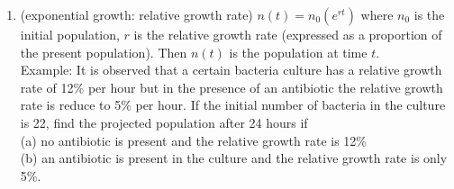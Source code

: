 \documentclass[11pt]{article}
\begin{document}
\begin{enumerate}
\vfill

\item (exponential growth: relative growth rate) $n(t)=n_0(e^{rt})$ where $n_0$ is the initial population, $r$ is the relative growth rate (expressed as a proportion of the present population). Then $n(t)$ is the population at time $t.$\\

Example: It is observed that a certain bacteria culture has a relative growth rate of 12\% per hour but in the presence of an antibiotic the relative growth rate is reduce to 5\% per hour. If the initial number of bacteria in the culture is 22, find the projected population after 24 hours if \\
(a) no antibiotic is present and the relative growth rate is 12\%\\
(b) an antibiotic is present in the culture and the relative growth rate is only 5\%.
\vfill

\end{enumerate}
\end{document}
